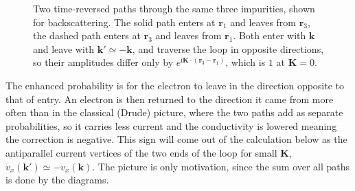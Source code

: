\begin{figure}[ht]
\centering
{}
\caption{Two time-reversed paths through the same three impurities, shown for backscattering. The solid path enters at $\mathbf r_1$ and leaves from $\mathbf r_3$, the dashed path enters at $\mathbf r_3$ and leaves from $\mathbf r_1$. Both enter with $\mathbf k$ and leave with $\mathbf k'\simeq-\mathbf k$, and traverse the loop in opposite directions, so their amplitudes differ only by $e^{\mathrm{i}\mathbf K\cdot(\mathbf r_3-\mathbf r_1)}$, which is $1$ at $\mathbf K=0$.}
\label{fig:wl_paths}
\end{figure}

The enhanced probability is for the electron to leave in the direction opposite to that of entry. An electron is then returned to the direction it came from more often than in the classical (Drude) picture, where the two paths add as separate probabilities, so it carries less current and the conductivity is lowered meaning the correction is negative. This sign will come out of the calculation below as the antiparallel current vertices of the two ends of the loop for small $\mathbf K$, $v_x(\mathbf k')\simeq-v_x(\mathbf k)$. The picture is only motivation, since the sum over all paths is done by the diagrams.

